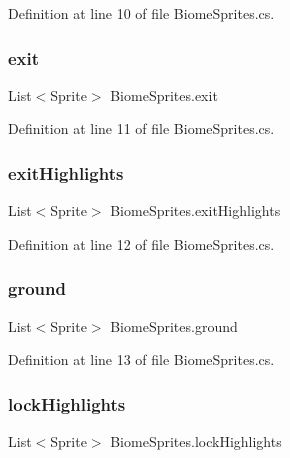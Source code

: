 Definition at line 10 of file Biome\+Sprites.\+cs.

\mbox{\label{class_biome_sprites_ae504f59a35b8bb0f6147a2ca926f1c25}} 
\subsubsection{\texorpdfstring{exit}{exit}}
{\footnotesize\ttfamily List$<$Sprite$>$ Biome\+Sprites.\+exit}



Definition at line 11 of file Biome\+Sprites.\+cs.

\mbox{\label{class_biome_sprites_a6bd7dcfd227829a0d67359dd4e67d666}} 
\subsubsection{\texorpdfstring{exitHighlights}{exitHighlights}}
{\footnotesize\ttfamily List$<$Sprite$>$ Biome\+Sprites.\+exit\+Highlights}



Definition at line 12 of file Biome\+Sprites.\+cs.

\mbox{\label{class_biome_sprites_ad2325cb250ec73430e73738fb4da15f9}} 
\subsubsection{\texorpdfstring{ground}{ground}}
{\footnotesize\ttfamily List$<$Sprite$>$ Biome\+Sprites.\+ground}



Definition at line 13 of file Biome\+Sprites.\+cs.

\mbox{\label{class_biome_sprites_a9afc6cf26fcf8ef18ee0ad3bfa95c000}} 
\subsubsection{\texorpdfstring{lockHighlights}{lockHighlights}}
{\footnotesize\ttfamily List$<$Sprite$>$ Biome\+Sprites.\+lock\+Highlights}



